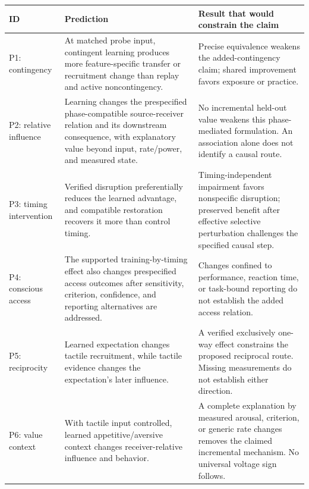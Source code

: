 \documentclass[
  american,
  11pt,
  letterpaper,
]{article}
\newcounter{none} %
\begin{document}
{\def\LTcaptype{none} %
\begin{longtable}[]{@{}
  >{\raggedright\arraybackslash}p{}
  >{\raggedright\arraybackslash}p{}
  >{\raggedright\arraybackslash}p{}@{}}
\toprule\noalign{}
\begin{minipage}[b]{\linewidth}\raggedright
ID
\end{minipage} & \begin{minipage}[b]{\linewidth}\raggedright
Prediction
\end{minipage} & \begin{minipage}[b]{\linewidth}\raggedright
Result that would constrain the claim
\end{minipage} \\
\midrule\noalign{}
\endhead
\bottomrule\noalign{}
\endlastfoot
P1: contingency & At matched probe input, contingent learning produces more feature-specific transfer or recruitment change than replay and active noncontingency. & Precise equivalence weakens the added-contingency claim; shared improvement favors exposure or practice. \\
P2: relative influence & Learning changes the prespecified phase-compatible source-receiver relation and its downstream consequence, with explanatory value beyond input, rate/power, and measured state. & No incremental held-out value weakens this phase-mediated formulation. An association alone does not identify a causal route. \\
P3: timing intervention & Verified disruption preferentially reduces the learned advantage, and compatible restoration recovers it more than control timing. & Timing-independent impairment favors nonspecific disruption; preserved benefit after effective selective perturbation challenges the specified causal step. \\
P4: conscious access & The supported training-by-timing effect also changes prespecified access outcomes after sensitivity, criterion, confidence, and reporting alternatives are addressed. & Changes confined to performance, reaction time, or task-bound reporting do not establish the added access relation. \\
P5: reciprocity & Learned expectation changes tactile recruitment, while tactile evidence changes the expectation's later influence. & A verified exclusively one-way effect constrains the proposed reciprocal route. Missing measurements do not establish either direction. \\
P6: value context & With tactile input controlled, learned appetitive/aversive context changes receiver-relative influence and behavior. & A complete explanation by measured arousal, criterion, or generic rate changes removes the claimed incremental mechanism. No universal voltage sign follows. \\
\end{longtable}
}
\end{document}
